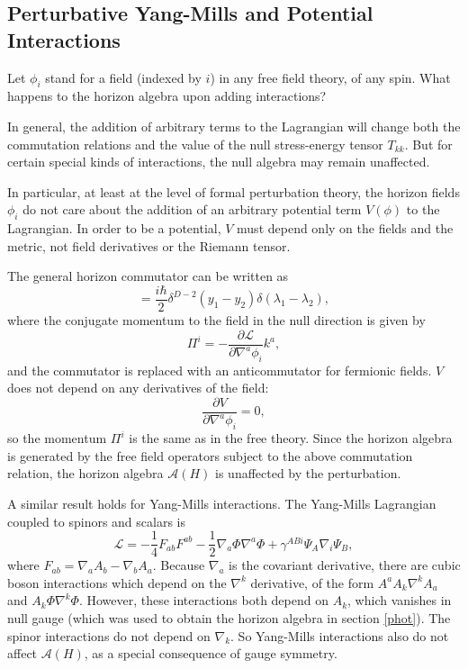 \documentclass[12pt]{article}
\begin{document}
\subsection{Perturbative Yang-Mills and Potential Interactions}

Let $\phi_i$ stand for a field (indexed by $i$) in any free field theory, of any spin.  What happens to the horizon algebra upon adding interactions?

In general, the addition of arbitrary terms to the Lagrangian will change both the commutation relations and the value of the null stress-energy tensor $T_{kk}$.  But for certain special kinds of interactions, the null algebra may remain unaffected.

In particular, at least at the level of formal perturbation theory, the horizon fields $\phi_i$ do not care about the addition of an arbitrary potential term $V(\phi)$ to the Lagrangian.  In order to be a potential, $V$ must depend only on the fields and the metric, not field derivatives or the Riemann tensor.

The general horizon commutator can be written as
\begin{equation}
[\phi_i ,\, \Pi^i] = \frac{i\hbar}{2} \delta^{D-2}(y_1 - y_2) \delta(\lambda_1 - \lambda_2),
\end{equation}
where the conjugate momentum to the field in the null direction is given by
\begin{equation}\label{conpi}
\Pi^i = -\frac{ \partial \mathcal{L} }{\partial \nabla^a \phi_i } k^a,
\end{equation}
and the commutator is replaced with an anticommutator for fermionic fields.  $V$ does not depend on any derivatives of the field:
\begin{equation}
\frac{ \partial V}{\partial \nabla^a \phi_i } = 0,
\end{equation}
so the momentum $\Pi^i$ is the same as in the free theory.  Since the horizon algebra is generated by the free field operators subject to the above commutation relation, the horizon algebra $\mathcal{A}(H)$ is unaffected by the perturbation.

A similar result holds for Yang-Mills interactions.  The Yang-Mills Lagrangian coupled to spinors and scalars is
\begin{equation}
\mathcal{L} = -\frac{1}{4} F_{ab} F^{ab} - \frac{1}{2} \nabla_a \Phi \nabla^a \Phi + \gamma^{ABi} \Psi_A \nabla_i \Psi_B,
\end{equation}
where $F_{ab} = \nabla_a A_b - \nabla_b A_a$.  Because $\nabla_a$ is the covariant derivative, there are cubic boson interactions which depend on the $\nabla^k$ derivative, of the form $A^a A_k \nabla^k A_a$ and $A_k \Phi \nabla^k \Phi$.  However, these interactions both depend on $A_k$, which vanishes in null gauge (which was used to obtain the horizon algebra in section \ref{phot}).  The spinor interactions do not depend on $\nabla_k$.  So Yang-Mills interactions also do not affect $\mathcal{A}(H)$, as a special consequence of gauge symmetry.
\end{document}
